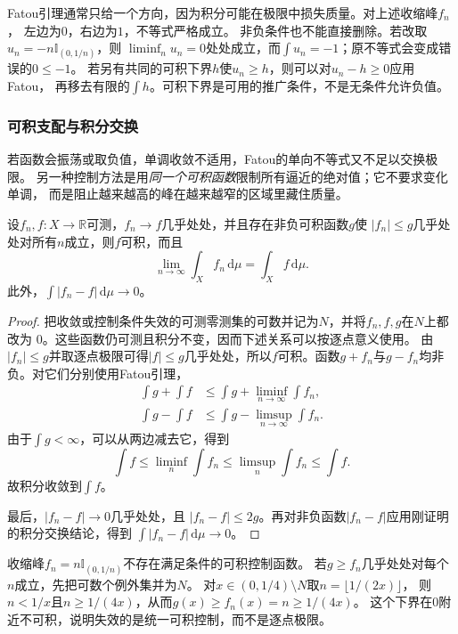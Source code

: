 Fatou引理通常只给一个方向，因为积分可能在极限中损失质量。对上述收缩峰$f_n$， 左边为$0$，右边为$1$，不等式严格成立。
非负条件也不能直接删除。若改取$u_n=-n\mathbb I_{(0,1/n)}$，则
$\liminf_n u_n=0$处处成立，而$\int u_n=-1$；原不等式会变成错误的$0\leq-1$。
若另有共同的可积下界$h$使$u_n\geq h$，则可以对$u_n-h\geq0$应用Fatou，
再移去有限的$\int h$。可积下界是可用的推广条件，不是无条件允许负值。

\subsubsection{可积支配与积分交换}

若函数会振荡或取负值，单调收敛不适用，Fatou的单向不等式又不足以交换极限。
另一种控制方法是用\emph{同一个可积函数}限制所有逼近的绝对值；它不要求变化单调，
而是阻止越来越高的峰在越来越窄的区域里藏住质量。
\begin{theorem}[支配收敛定理]
\label{thm:analysis-dominated-convergence}
设$f_n,f:X\to\mathbb{R}$可测，$f_n\to f$几乎处处，并且存在非负可积函数$g$使
$|f_n|\leq g$几乎处处对所有$n$成立，则$f$可积，而且
\[   \lim_{n\to\infty}\int_Xf_n\,\mathrm{d}\mu   =   \int_Xf\,\mathrm{d}\mu. \]
此外，$\int|f_n-f|\,\mathrm{d}\mu\to0$。
\end{theorem}
\begin{proof}
把收敛或控制条件失效的可测零测集的可数并记为$N$，并将$f_n,f,g$在$N$上都改为
$0$。这些函数仍可测且积分不变，因而下述关系可以按逐点意义使用。
由$|f_n|\leq g$并取逐点极限可得$|f|\leq g$几乎处处，所以$f$可积。函数$g+f_n$与$g-f_n$均非负。对它们分别使用Fatou引理，
\begin{align*}
  \int g+\int f
  &\leq
  \int g+\liminf_{n\to\infty}\int f_n,\\
  \int g-\int f
  &\leq
  \int g-\limsup_{n\to\infty}\int f_n.
\end{align*}
由于$\int g<\infty$，可以从两边减去它，得到
\[   \int f   \leq\liminf_n\int f_n   \leq\limsup_n\int f_n   \leq\int f. \]
故积分收敛到$\int f$。

最后，$|f_n-f|\to0$几乎处处，且 $|f_n-f|\leq2g$。再对非负函数$|f_n-f|$应用刚证明的积分交换结论，得到 $\int|f_n-f|\,\mathrm{d}\mu\to0$。
\end{proof}

收缩峰$f_n=n\mathbb{I}_{(0,1/n)}$不存在满足条件的可积控制函数。
若$g\geq f_n$几乎处处对每个$n$成立，先把可数个例外集并为$N$。
对$x\in(0,1/4)\setminus N$取$n=\lfloor1/(2x)\rfloor$，
则$n<1/x$且$n\geq1/(4x)$，从而$g(x)\geq f_n(x)=n\geq1/(4x)$。
这个下界在$0$附近不可积，说明失效的是统一可积控制，而不是逐点极限。

